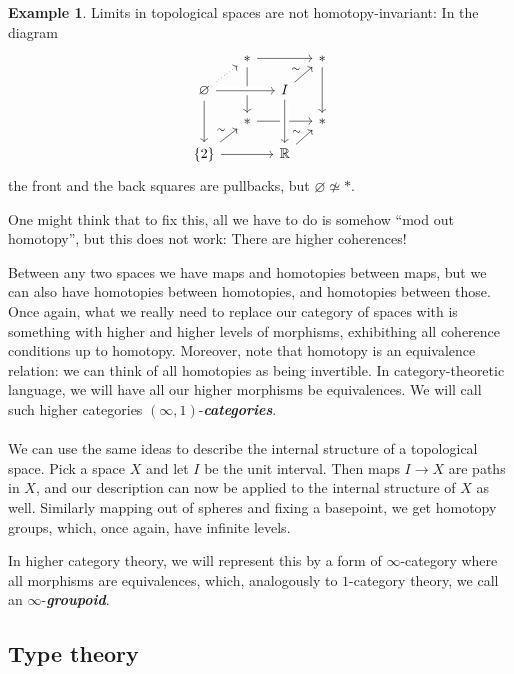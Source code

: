 \documentclass{article}
\newcommand{\textbi}[1]{\textbf{\textit{#1}}}
\newcommand{\bR}{\mathbb{R}}
\theoremstyle{definition}
\newtheorem{ex}[subsection]{Example}
\begin{document}
\begin{ex}
    Limits in topological spaces are not homotopy-invariant:
    In the diagram
    \[
    \begin{tikzcd}[sep=small]
        & * \arrow[rr] \arrow[dd] & & * \arrow[from = dl, "\sim"] \arrow[dd] \\
        \varnothing \arrow[ur, dotted] \arrow[rr, crossing over] \arrow[dd] & & I  & \\ 
        & * \arrow[rr] \arrow[from = dl, "\sim"] & & * \arrow[from = dl, "\sim"] \\
        \{2\} \arrow[rr] & & \bR \arrow[from = uu, crossing over] &
    \end{tikzcd}
    \]
    the front and the back squares are pullbacks, but $\varnothing\not\simeq *$.
\end{ex}

One might think that to fix this, all we have to do is somehow ``mod out homotopy'', but this does not work: There are higher coherences!
\par Between any two spaces we have maps and homotopies between maps, but we can also have homotopies between homotopies, and homotopies between those. Once again, what we really need to replace our category of spaces with is something with higher and higher levels of morphisms, exhibithing all coherence conditions up to homotopy. Moreover, note that homotopy is an equivalence relation: we can think of all homotopies as being invertible. In category-theoretic language, we will have all our higher morphisms be equivalences. We will call such higher categories $(\infty,1)$-\textbi{categories}.\\ \\ 
We can use the same ideas to describe the internal structure of a topological space. Pick a space $X$ and let $I$ be the unit interval. Then maps $I\to X$ are paths in $X$, and our description can now be applied to the internal structure of $X$ as well. Similarly mapping out of spheres and fixing a basepoint, we get homotopy groups, which, once again, have infinite levels.
\par In higher category theory, we will represent this by a form of $\infty$-category where all morphisms are equivalences, which, analogously to $1$-category theory, we call an $\infty$-\textbi{groupoid}.


\subsection*{Type theory}
\end{document}
